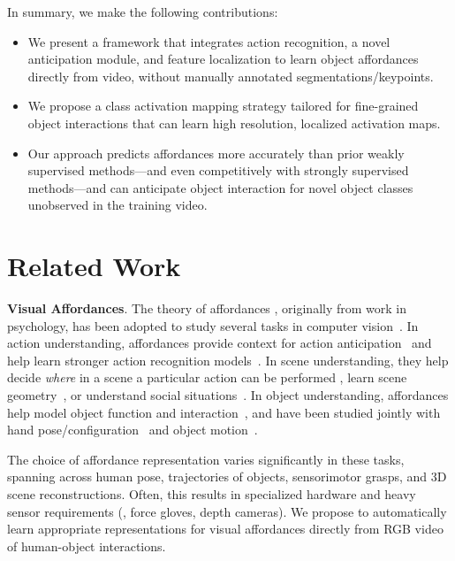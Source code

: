 \documentclass[10pt,twocolumn,letterpaper]{article}
\begin{document}
\vspace{0.1in}
\noindent In summary, we make the following contributions:
\begin{itemize}[leftmargin=*]
    \itemsep0em 
    \item We present a framework that integrates action recognition, a novel anticipation module, and feature localization to learn object affordances directly from video, without manually annotated segmentations/keypoints.
    \item We propose a class activation mapping strategy tailored for fine-grained object interactions that can learn high resolution, localized activation maps.
    \item Our approach predicts affordances more accurately than prior weakly supervised methods---and even competitively with strongly supervised methods---and can anticipate object interaction for novel object classes unobserved in the training video. \end{itemize}

 \section{Related Work}

\vspace{0.05in}
\noindent\textbf{Visual Affordances}.
The theory of affordances \cite{gibson1979ecological}, originally from work in psychology, has been adopted to study several tasks in computer vision~\cite{hassanin2018visual}. 
In action understanding, affordances provide context for action anticipation~\cite{koppula2016anticipating,rhinehart2016learning,zhou2016cascaded} and  help learn stronger action recognition models~\cite{koppula2013learning}.
In scene understanding, they help decide \textit{where} in a scene a particular action can be performed \cite{savva2014scenegrok,grabner2011makes,wang2017binge,delaitre2012scene}, learn scene geometry~\cite{gupta20113d,fouhey2014people}, or understand social situations~\cite{chuang2017learning}.
In object understanding, affordances help model object function and interaction~\cite{stark2008functional,yao2010grouplet,zhu2015understanding}, and have been studied jointly with hand pose/configuration~\cite{kjellstrom2011visual,thermos2017deep,castellini2011using} and object motion~\cite{gupta2007objects,gupta2009observing}. 

The choice of affordance representation varies significantly in these tasks, spanning across human pose, trajectories of objects, sensorimotor grasps, and 3D scene reconstructions. Often, this results in specialized hardware and heavy sensor requirements (\eg, force gloves, depth cameras). We propose to automatically learn appropriate representations for visual affordances  directly from RGB video of human-object interactions.
\end{document}

